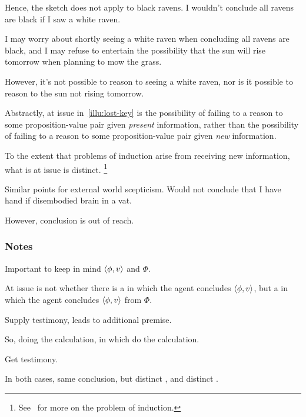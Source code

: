 \begin{note}
  Hence, the sketch does not apply to black ravens.
  I wouldn't conclude all ravens are black if I saw a white raven.

  I may worry about shortly seeing a white raven when concluding all ravens are black, and I may refuse to entertain the possibility that the sun will rise tomorrow when planning to mow the grass.

  However, it's not possible to reason to seeing a white raven, nor is it possible to reason to the sun not rising tomorrow.

  Abstractly, at issue in~\autoref{illu:lost-key} is the possibility of failing to a reason to some proposition-value pair given \emph{present} information, rather than the possibility of failing to a reason to some proposition-value pair given \emph{new} information.

  To the extent that problems of induction arise from receiving new information, what is at issue is distinct.%
  \footnote{
    See~\textcite{Henderson:2020wb} for more on the problem of induction.
  }

  Similar points for external world scepticism.
  Would not conclude that I have hand if disembodied brain in a vat.

  However, conclusion is out of reach.
\end{note}

\subsubsection{Notes}
\label{sec:notes}

\begin{note}
  Important to keep in mind \(\langle \phi, v \rangle\) and \(\Phi\).

  At issue is not whether there is a \pevent{} in which the agent concludes \(\langle \phi, v \rangle\), but a \pevent{} in which the agent concludes \(\langle \phi, v \rangle\) from \(\Phi\).
\end{note}

\begin{note}
  Supply testimony, leads to additional premise.

  So, doing the calculation, \pevent{} in which do the calculation.

  Get testimony.

  In both cases, same conclusion, but distinct , and distinct .
\end{note}

